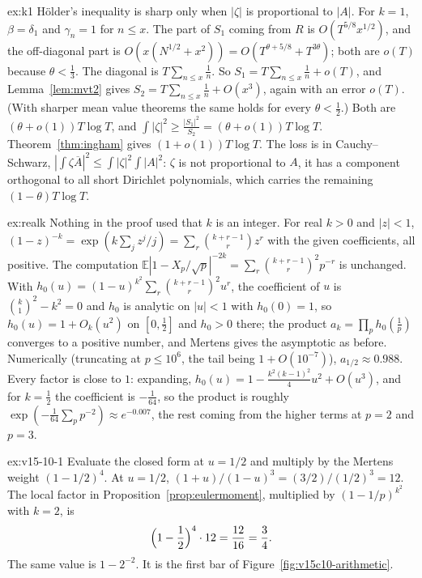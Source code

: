\begin{solution}{ex:k1}
\idea Hölder's inequality is sharp only when $|\zeta|$ is proportional to $|A|$.
\writeup For $k=1$, $\beta=\delta_1$ and $\gamma_n=1$ for $n\le x$. The part of $S_1$ coming from $R$ is $O(T^{5/8}x^{1/2})$, and the off-diagonal part is $O(x(N^{1/2}+x^2))=O(T^{\theta+5/8}+T^{3\theta})$; both are $o(T)$ because $\theta<\frac13$. The diagonal is $T\sum_{n\le x}\frac1n$. So $S_1=T\sum_{n\le x}\frac1n+o(T)$, and Lemma~\ref{lem:mvt2} gives $S_2=T\sum_{n\le x}\frac1n+O(x^3)$, again with an error $o(T)$. (With sharper mean value theorems the same holds for every $\theta<\frac12$.) Both are $(\theta+o(1))T\log T$, and $\int|\zeta|^2\ge\frac{|S_1|^2}{S_2}=(\theta+o(1))T\log T$. Theorem~\ref{thm:ingham} gives $(1+o(1))T\log T$. The loss is in Cauchy--Schwarz, $|\int\zeta\overline A|^2\le\int|\zeta|^2\int|A|^2$: $\zeta$ is not proportional to $A$, it has a component orthogonal to all short Dirichlet polynomials, which carries the remaining $(1-\theta)T\log T$.
\end{solution}

\begin{solution}{ex:realk}
\idea Nothing in the proof used that $k$ is an integer.
\writeup For real $k>0$ and $|z|<1$, $(1-z)^{-k}=\exp(k\sum_jz^j/j)=\sum_r\binom{k+r-1}rz^r$ with the given coefficients, all positive. The computation $\mathbb E|1-X_p/\sqrt p|^{-2k}=\sum_r\binom{k+r-1}r^2p^{-r}$ is unchanged. With $h_0(u)=(1-u)^{k^2}\sum_r\binom{k+r-1}r^2u^r$, the coefficient of $u$ is $\binom k1^2-k^2=0$ and $h_0$ is analytic on $|u|<1$ with $h_0(0)=1$, so $h_0(u)=1+O_k(u^2)$ on $[0,\frac12]$ and $h_0>0$ there; the product $a_k=\prod_ph_0(\frac1p)$ converges to a positive number, and Mertens gives the asymptotic as before. Numerically (truncating at $p\le10^6$, the tail being $1+O(10^{-7})$), $a_{1/2}\approx0.988$. Every factor is close to $1$: expanding, $h_0(u)=1-\frac{k^2(k-1)^2}{4}u^2+O(u^3)$, and for $k=\frac12$ the coefficient is $-\frac1{64}$, so the product is roughly $\exp(-\frac1{64}\sum_pp^{-2})\approx e^{-0.007}$, the rest coming from the higher terms at $p=2$ and $p=3$.
\end{solution}

\begin{solution}{ex:v15-10-1}
\idea Evaluate the closed form at \(u=1/2\) and multiply by the Mertens weight \((1-1/2)^4\).
\writeup At \(u=1/2\), \((1+u)/(1-u)^3=(3/2)/(1/2)^3=12\). The local factor in Proposition~\ref{prop:eulermoment}, multiplied by \((1-1/p)^{k^2}\) with \(k=2\), is
\[
\Bigl(1-\frac12\Bigr)^4\cdot12=\frac{12}{16}=\frac34.
\]
The same value is \(1-2^{-2}\). It is the first bar of Figure~\ref{fig:v15c10-arithmetic}.
\end{solution}

